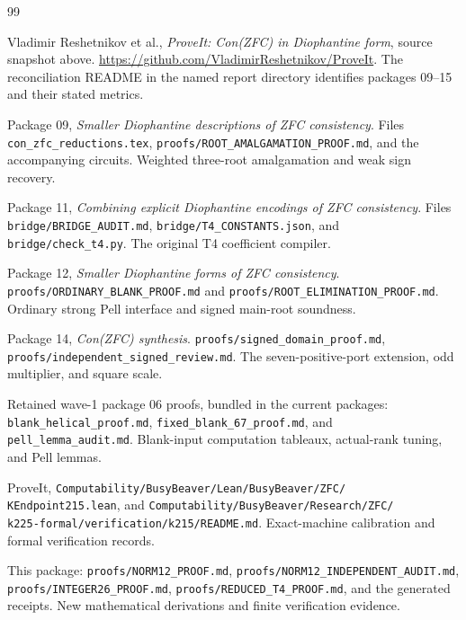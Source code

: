 \documentclass[11pt]{article}
\theoremstyle{remark}\newtheorem{remark}[theorem]{Remark}
\begin{document}
\begin{thebibliography}{99}
\raggedright
{}
Vladimir Reshetnikov et al.,
\emph{ProveIt: Con(ZFC) in Diophantine form}, source snapshot above.
\url{https://github.com/VladimirReshetnikov/ProveIt}.
The reconciliation README in the named report directory identifies
packages 09--15 and their stated metrics.

Package 09, \emph{Smaller Diophantine descriptions of ZFC consistency}.
Files \texttt{con\_zfc\_reductions.tex},
\texttt{proofs/ROOT\_AMALGAMATION\_PROOF.md}, and the accompanying circuits.
Weighted three-root amalgamation and weak sign recovery.

Package 11, \emph{Combining explicit Diophantine encodings of ZFC consistency}.
Files \texttt{bridge/BRIDGE\_AUDIT.md},
\texttt{bridge/T4\_CONSTANTS.json}, and \texttt{bridge/check\_t4.py}.
The original T4 coefficient compiler.

Package 12, \emph{Smaller Diophantine forms of ZFC consistency}.
\texttt{proofs/ORDINARY\_BLANK\_PROOF.md} and
\texttt{proofs/ROOT\_ELIMINATION\_PROOF.md}.
Ordinary strong Pell interface and signed main-root soundness.

Package 14, \emph{Con(ZFC) synthesis}.
\texttt{proofs/signed\_domain\_proof.md},
\texttt{proofs/independent\_signed\_review.md}.
The seven-positive-port extension, odd multiplier, and square scale.

Retained wave-1 package 06 proofs, bundled in the current packages:
\texttt{blank\_helical\_proof.md},
\texttt{fixed\_blank\_67\_proof.md}, and
\texttt{pell\_lemma\_audit.md}.
Blank-input computation tableaux, actual-rank tuning, and Pell lemmas.

ProveIt, \texttt{Computability/BusyBeaver/Lean/BusyBeaver/ZFC/}\\
\texttt{KEndpoint215.lean}, and
\texttt{Computability/BusyBeaver/Research/ZFC/}\\
\texttt{k225-formal/verification/k215/README.md}.
Exact-machine calibration and formal verification records.

This package: \texttt{proofs/NORM12\_PROOF.md},
\texttt{proofs/NORM12\_INDEPENDENT\_AUDIT.md},
\texttt{proofs/INTEGER26\_PROOF.md},
\texttt{proofs/REDUCED\_T4\_PROOF.md}, and the generated receipts.
New mathematical derivations and finite verification evidence.
\end{thebibliography}
\end{document}

